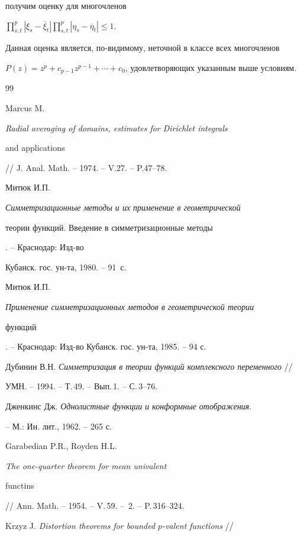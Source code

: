 получим оценку для многочленов


$\prod\limits_{s, t}^{p}|\xi_s-\overline{\xi}_t|


\prod\limits_{s, t}^{p}|\eta_s-\overline{\eta}_t|\leq 1.$


Данная оценка является, по-видимому, неточной в классе всех многочленов


$P(z)=z^p+c_{p-1}z^{p-1}+\dotsb+c_0$, удовлетворяющих указанным выше условиям.





\begin{thebibliography}{99}







Marcus M. {\em Radial averaging of domains, estimates for Dirichlet integrals


and applications} // J. Anal. Math. -- 1974. -- V.27. -- P.47--78.




Митюк И.П. {\em Симметризационные методы и их применение в геометрической


теории функций. Введение в симметризационные методы}. -- Краснодар: Изд-во


Кубанск. гос. ун-та, 1980. -- 91~с.




Митюк И.П. {\em Применение симметризационных методов в геометрической теории


функций}. -- Краснодар: Изд-во Кубанск. гос. ун-та, 1985. -- 94 с.




Дубинин В.Н. {\em Симметризация в теории функций комплексного переменного} //


УМН. -- 1994. -- Т.\,49. -- Вып.\,1. -- С.\,3--76.




Дженкинс Дж. {\em Однолистные функции и конформные отображения}.


-- М.: Ин. лит., 1962. -- 265 с.




Garabedian P.R., Royden H.L. {\em The one-quarter theorem for mean univalent


functins} // Ann. Math. -- 1954. -- V.\,59. -- \No\,2. -- P.\,316--324.




Krzyz J. {\em Distortion theorems for bounded $p$-valent functions} //



\end{thebibliography}
